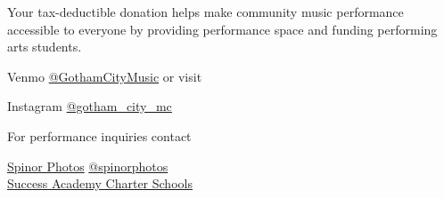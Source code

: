 \documentclass{article}[10pt]
\begin{document}
\begin{center}
\begin{minipage}{4in}
            \begin{center}
            {\textbf{}}
            \end{center}

            \vspace{-0.1in}

            \begin{small}
                Your tax-deductible donation helps make community music performance accessible to everyone by providing performance space and funding performing arts students.\\
            \end{small}


            Venmo \href{https://account.venmo.com/u/GothamCityMusic}{@GothamCityMusic} or visit \textbf{}

            \begin{center}
            {\textbf{}}

                \faInstagram{}{}  Instagram  \href{https://www.instagram.com/gotham_city_mc/}{@gotham\_city\_mc}


                For performance inquiries contact
                    {\textbf{}}
            \end{center}

           \begin{center}
            {\textbf{}}

                \href{https://www.spinorphotos.com/}{Spinor Photos}
                \faInstagram{}{} \href{https://www.instagram.com/spinorphotos}{@spinorphotos}\\
                \href{https://www.successacademies.org/}{Success Academy Charter Schools}
            \end{center}

        \end{minipage}

    \end{center}
\end{document}
